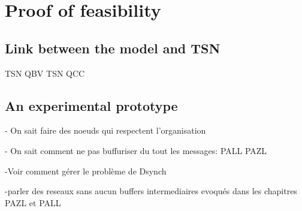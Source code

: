 
\chapter{Proof of feasibility}
\label{chap:TSN}
\minitoc



\section{Link between the model and TSN}

 TSN QBV
 TSN QCC
\section{An experimental prototype}

- On sait faire des noeuds qui respectent l'organisation

- On sait comment ne pas buffuriser du tout les messages: PALL PAZL

-Voir comment gérer le problème de Dsynch

-parler des reseaux sans aucun buffers intermediaires evoqués dans les chapitres PAZL et PALL